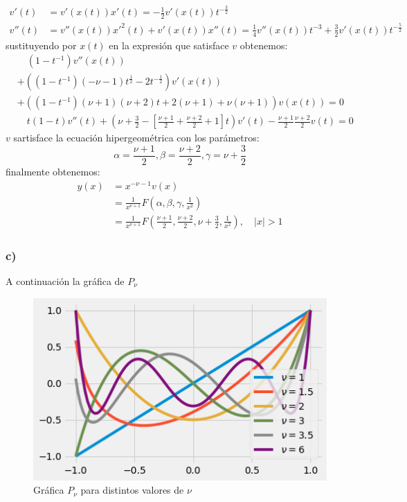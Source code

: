 \documentclass{article}
\begin{document}
\begin{tcolorbox}[breakable]
\begin{align*}
            v'(t) &= v'(x(t))x'(t) = -\frac{1}{2}v'(x(t))t^{-\frac{3}{2}} \\
            v''(t) &= v''(x(t))x'^2(t) + v'(x(t))x''(t) = \frac{1}{4} v''(x(t))t^{-3} + \frac{3}{2}v'(x(t))t^{-\frac{5}{2}}
        \end{align*}
        sustituyendo por $x(t)$ en la expresión que satisface $v$ obtenemos:
        \begin{align*}
            &\quad (1-t^{-1})v''(x(t)) \\
            &+((1-t^{-1})(-\nu-1)t^{\frac{1}{2}} - 2t^{-\frac{1}{2}})v'(x(t)) \\
            &+((1-t^{-1})(\nu+1)(\nu+2)t + 2(\nu+1) + \nu(\nu+1))v(x(t)) = 0 \\
            &\quad t(1-t)v''(t) 
            +\left(\nu + \frac{3}{2} -  \left[ \frac{\nu+1}{2}+\frac{\nu+2}{2}+1\right]t \right)v'(t) 
            -\frac{\nu+1}{2}\frac{\nu+2}{2}v(t) = 0
        \end{align*}
        $v$ sartisface la ecuación hipergeométrica con los parámetros:
        \[ \alpha = \frac{\nu+1}{2},\beta = \frac{\nu+2}{2}, \gamma = \nu+\frac{3}{2} \]
        finalmente obtenemos:
        \begin{align*}
            y(x) 
            &= x^{-\nu-1}v(x) \\
            &= \frac{1}{x^{\nu+1}}F\left(\alpha,\beta,\gamma, \frac{1}{x^2} \right) \\
            &= \frac{1}{x^{\nu+1}}F\left(\frac{\nu+1}{2}, \frac{\nu+2}{2}, \nu+\frac{3}{2}, \frac{1}{x^2} \right), \quad |x|>1
        \end{align*}
    \subsubsection*{c)}
    A continuación la gráfica de $P_\nu$
    \begin{figure}[H]
        \centering
        \includegraphics[scale=0.7]{images/p2_p.png}
        \caption{Gráfica $P_\nu$ para distintos valores de $\nu$}
    \end{figure}
\end{tcolorbox}
\end{document}
